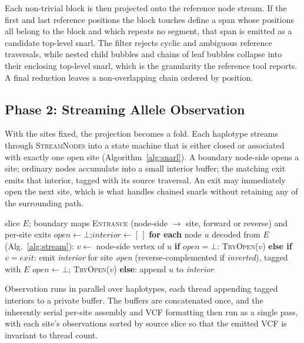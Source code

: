 Each non-trivial block is then projected onto the reference node stream. If the
first and last reference positions the block touches define a span whose positions
all belong to the block and which repeats no segment, that span is emitted as a
candidate top-level snarl. The filter rejects cyclic and ambiguous reference
traversals, while nested child bubbles and chains of leaf bubbles collapse into
their enclosing top-level snarl, which is the granularity the reference tool
reports. A final reduction leaves a non-overlapping chain ordered by position.

\subsection{Phase 2: Streaming Allele Observation}
\label{subsec:dec-phase2}

With the sites fixed, the projection becomes a fold. Each haplotype streams
through \textsc{StreamNodes} into a state machine that is either closed or
associated with exactly one open site (Algorithm~\ref{alg:snarl}). A boundary
node-side opens a site; ordinary nodes accumulate into a small interior buffer;
the matching exit emits that interior, tagged with its source traversal. An exit
may immediately open the next site, which is what handles chained snarls without
retaining any of the surrounding path.

\begin{algorithm}[t]
\small
\caption{Allele observation for one haplotype}
\label{alg:snarl}
\begin{algorithmic}[1]
  \REQUIRE slice $E$; boundary maps \textsc{Entrance} (node-side $\to$ site,
           forward or reverse) and per-site exits
  \STATE $\textit{open}\gets\bot$;\quad $\textit{interior}\gets[\,]$
  \STATE \textbf{for each} node $u$ decoded from $E$ (Alg.~\ref{alg:stream}):
  \STATE \quad $v\gets$ node-side vertex of $u$
  \STATE \quad \textbf{if} $\textit{open}=\bot$: \textsc{TryOpen}($v$)
  \STATE \quad \textbf{else if} $v=\textit{exit}$:
  \STATE \qquad emit \textit{interior} for site \textit{open}
         (reverse-complemented if \textit{inverted}), tagged with $E$
  \STATE \qquad $\textit{open}\gets\bot$; \textsc{TryOpen}($v$)
  \STATE \quad \textbf{else}: append $u$ to \textit{interior}
\end{algorithmic}
\end{algorithm}

Observation runs in parallel over haplotypes, each thread appending tagged
interiors to a private buffer. The buffers are concatenated once, and the
inherently serial per-site assembly and VCF formatting then run as a single pass,
with each site's observations sorted by source slice so that the emitted VCF is
invariant to thread count.


